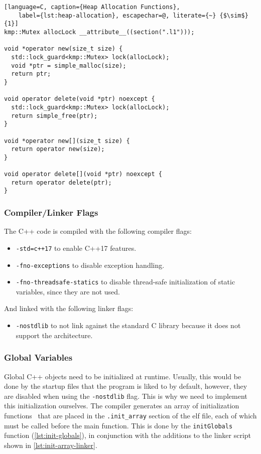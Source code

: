 \begin{lstlisting}[language=C, caption={Heap Allocation Functions},
	label={lst:heap-allocation}, escapechar=@, literate={~} {$\sim$}{1}]
kmp::Mutex allocLock __attribute__((section(".l1")));

void *operator new(size_t size) {
  std::lock_guard<kmp::Mutex> lock(allocLock);
  void *ptr = simple_malloc(size);
  return ptr;
}

void operator delete(void *ptr) noexcept {
  std::lock_guard<kmp::Mutex> lock(allocLock);
  return simple_free(ptr);
}

void *operator new[](size_t size) {
  return operator new(size);
}

void operator delete[](void *ptr) noexcept {
  return operator delete(ptr);
}
\end{lstlisting}

\subsubsection{Compiler/Linker Flags}

The C++ code is compiled with the following compiler flags:
\begin{itemize}
	\item \texttt{-std=c++17} to enable C++17 features.
	\item \texttt{-fno-exceptions} to disable exception handling.
	\item \texttt{-fno-threadsafe-statics} to disable thread-safe initialization of static
	      variables, since they are not used.
\end{itemize}

And linked with the following linker flags:
\begin{itemize}
	\item \texttt{-nostdlib} to not link against the standard C library because it does not support
	      the architecture.
\end{itemize}

\subsubsection{Global Variables}

Global C++ objects need to be initialized at runtime. Usually, this would be done by the startup
files that the program is liked to by default, however, they are disabled when using the
\texttt{-nostdlib} flag. This is why we need to implement this initialization ourselves. The
compiler generates an array of initialization functions~\cite{crt-startup} that are placed in the
\texttt{.init\_array} section of the \gls{elf} file, each of which must be called before the main
function. This is done by the \texttt{initGlobals} function (\cref{lst:init-globals}), in
conjunction with the additions to the linker script shown in \cref{lst:init-array-linker}.


